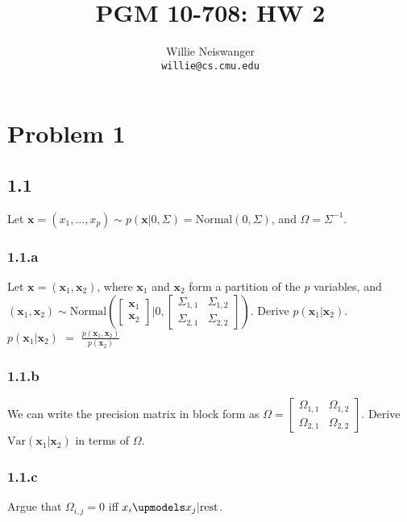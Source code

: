 \documentclass[12pt]{article}
\title{PGM 10-708: HW 2}
\author{Willie Neiswanger\\
\texttt{willie@cs.cmu.edu}}
\date{}
\begin{document}
\maketitle


\section*{Problem 1}
\label{sec:prob1}

\subsection*{1.1}
Let $\textbf{x} = (x_1,\ldots,x_p) \sim p(\textbf{x} | 0, \Sigma) = \text{Normal}(0,\Sigma)$, and $\Omega = \Sigma^{-1}$.

\subsubsection*{1.1.a}
Let $\textbf{x} = (\textbf{x}_1,\textbf{x}_2)$, where $\textbf{x}_1$ and $\textbf{x}_2$ form a partition of the $p$ variables, and 
$(\textbf{x}_1,\textbf{x}_2) \sim 
\text{Normal} \left( \left[ \begin{smallmatrix} \textbf{x}_1 \\ \textbf{x}_2 \end{smallmatrix} \right] | 0, \left[ \begin{smallmatrix} \Sigma_{1,1}& \Sigma_{1,2} \\ \Sigma_{2,1} & \Sigma_{2,2} \end{smallmatrix} \right] \right)$.
Derive $p(\textbf{x}_1 | \textbf{x}_2)$.\\

$p(\textbf{x}_1 | \textbf{x}_2)$ $=$ $\frac{p(\textbf{x}_1, \textbf{x}_2)}{p(\textbf{x}_2)}$

\subsubsection*{1.1.b}
We can write the precision matrix in block form as $\Omega = \left[ 
\begin{smallmatrix} \Omega_{1,1} & \Omega_{1,2} \\ \Omega_{2,1} & \Omega_{2,2}
\end{smallmatrix} \right]$.
Derive $\text{Var}(\textbf{x}_1 | \textbf{x}_2)$ in terms of $\Omega$.

\subsubsection*{1.1.c}
Argue that $\Omega_{i,j}=0$ iff $x_i \upmodels x_j | \text{rest}$.\\
\end{document}
